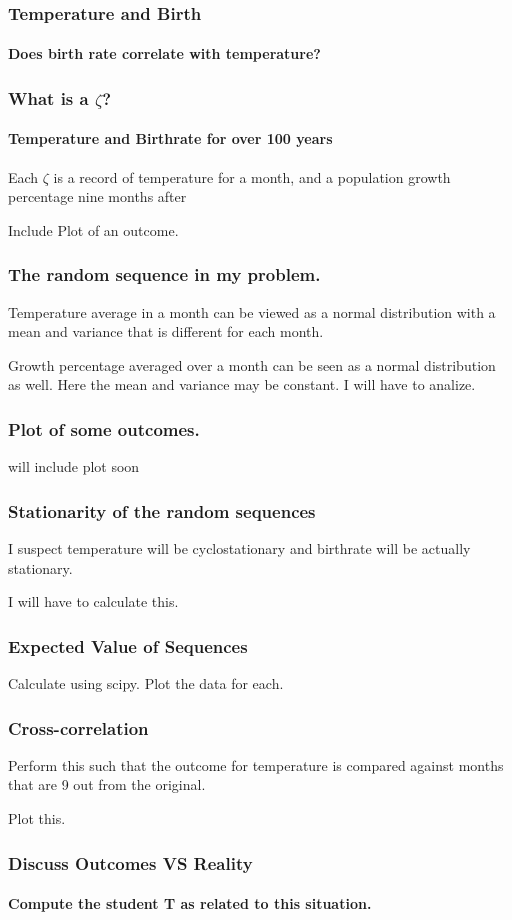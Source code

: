 \documentclass{beamer}
\begin{document}
  \begin{frame}
    \frametitle{Temperature and Birth}
    \framesubtitle{Does birth rate correlate with temperature?}
  \end{frame}
  \begin{frame}
    \frametitle{What is a $\zeta$?}
    \framesubtitle{Temperature and Birthrate for over 100 years}
    Each $\zeta$ is a record of temperature for a month, and a 
    population growth percentage nine months after

    Include Plot of an outcome.
  \end{frame}
  \begin{frame}
    \frametitle{The random sequence in my problem.}
    Temperature average in a month can be viewed as a normal distribution with 
    a mean and variance that is different for each month.

    Growth percentage averaged over a month can be seen as a normal distribution 
    as well. Here the mean and variance may be constant. I will have to 
    analize.

  \end{frame}
  \begin{frame}
    \frametitle{Plot of some outcomes.}
    will include plot soon
    
  \end{frame}
  \begin{frame}
    \frametitle{Stationarity of the random sequences}
    I suspect temperature will be cyclostationary and birthrate will be 
    actually stationary. 
    
    I will have to calculate this.
  \end{frame}
  \begin{frame}
    \frametitle{Expected Value of Sequences}
    Calculate using scipy.
    Plot the data for each.
  \end{frame}
  \begin{frame}
    \frametitle{Cross-correlation}
    Perform this such that the outcome for temperature is compared against 
    months that are 9 out from the original.

    Plot this.
  \end{frame}
  \begin{frame}
    \frametitle{Discuss Outcomes VS Reality}
    \framesubtitle{Compute the student T as related to this situation.}
  \end{frame}
\end{document}
